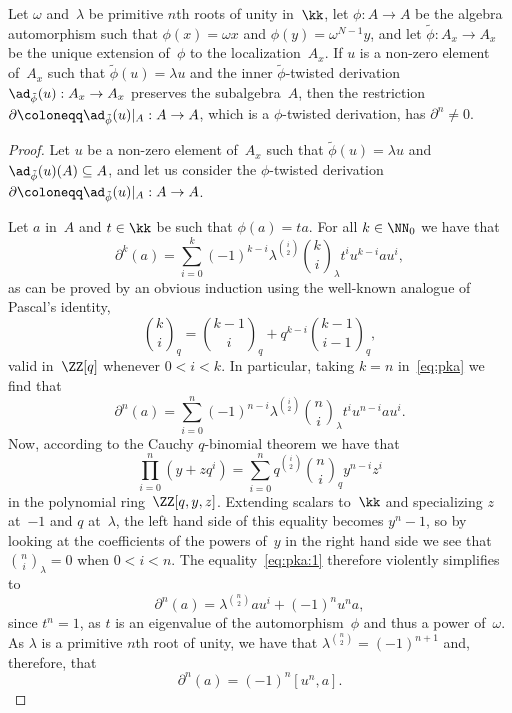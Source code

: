 \begin{Lemma}\label{lemma:non-zero}
Let $\omega$ and~$\lambda$ be primitive $n$th roots of unity in~$\kk$, let
$\phi:A\to A$ be the algebra automorphism such that $\phi(x)=\omega x$ and
$\phi(y)=\omega^{N-1}y$, and let $\tilde\phi:A_x\to A_x$ be the unique
extension of~$\phi$ to the localization~$A_x$. If $u$ is a non-zero
element of~$A_x$ such that $\tilde\phi(u)=\lambda u$ and the inner
$\tilde\phi$-twisted derivation $\ad_{\tilde\phi}(u):A_x\to A_x$ preserves
the subalgebra~$A$, then the restriction
  \(
  \partial\coloneqq\ad_{\tilde\phi}(u)|_A:A\to A
  \),
which is a $\phi$-twisted derivation, has $\partial^n\neq0$.
\end{Lemma}

\begin{proof}
Let $u$ be a non-zero element of~$A_x$ such that $\tilde\phi(u)=\lambda u$
and $\ad_{\tilde\phi}(u)(A)\subseteq A$, and let us consider the
$\phi$-twisted derivation $\partial\coloneqq\ad_{\tilde\phi}(u)|_A:A\to A$.

Let $a$ in~$A$ and $t\in\kk$ be such that $\phi(a)=ta$. For all $k\in\NN_0$
we have that
  \[ \label{eq:pka}
  \partial^k(a) 
        = \sum_{i=0}^k (-1)^{k-i}
                       \lambda^{\binom{i}{2}}
                       \binom{k}{i}_\lambda 
                       t^i u^{k-i}au^i,
  \]
as can be proved by an obvious induction using the well-known analogue of
Pascal's identity,
  \[
  \binom{k}{i}_q = \binom{k-1}{i}_q + q^{k-i}\binom{k-1}{i-1}_q,
  \]
valid in~$\ZZ[q]$ whenever $0<i<k$. In particular, taking $k=n$
in~\eqref{eq:pka} we find that
  \[ \label{eq:pka:1}
  \partial^n(a) 
        = \sum_{i=0}^n 
                (-1)^{n-i}
                \lambda^{\binom{i}{2}}
                \binom{n}{i}_\lambda 
                t^i u^{n-i}au^i.
  \]
Now, according to the Cauchy $q$-binomial theorem we have that
  \[
  \prod_{i=0}^n (y+zq^i) = \sum_{i=0}^nq^{\binom{i}{2}}\binom{n}{i}_qy^{n-i}z^i
  \]
in the polynomial ring~$\ZZ[q,y,z]$. Extending scalars to~$\kk$ and
specializing $z$ at~$-1$ and $q$ at~$\lambda$, the left hand side of this
equality becomes $y^n-1$, so by looking at the coefficients of the powers
of~$y$ in the right hand side we see that $\binom{n}{i}_\lambda=0$ when
$0<i<n$. The equality~\eqref{eq:pka:1} therefore violently simplifies to
  \[
  \partial^n(a) = \lambda^{\binom{n}{2}}au^i + (-1)^nu^na,
  \]
since $t^n=1$, as $t$ is an eigenvalue of the automorphism~$\phi$ and thus
a power of~$\omega$. As $\lambda$ is a primitive $n$th root of unity,
we have that $\lambda^{\binom{n}{2}}=(-1)^{n+1}$ and, therefore, that
  \[
  \partial^n(a) = (-1)^n[u^n,a].
  \]


\end{proof}
